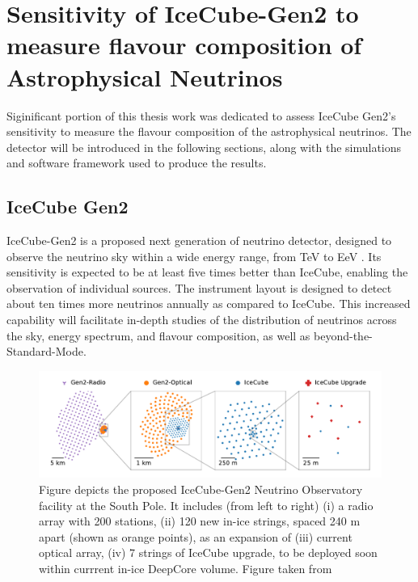 \setchapterpreamble[u]{\margintoc}
\chapter{Sensitivity of IceCube-Gen2 to measure flavour composition of Astrophysical Neutrinos}
Siginificant portion of this thesis work was dedicated to assess IceCube Gen2's sensitivity to measure the flavour composition of the astrophysical neutrinos. The detector will be introduced in the following sections, along with the simulations and software framework used to produce the results. 

\section{IceCube Gen2} 
\label{sec:gen2-detector}
IceCube-Gen2 is a proposed next generation of neutrino detector, designed to observe the neutrino sky within a wide energy range, from TeV to EeV . Its sensitivity is expected to be at least five times better than IceCube, enabling the observation of individual sources. The instrument layout is designed to detect about ten times more neutrinos annually as compared to IceCube. This increased capability will facilitate in-depth studies of the distribution of neutrinos across the sky, energy spectrum, and flavour composition, as well as beyond-the-Standard-Mode.
\begin{figure}[h!]
	\includegraphics[scale=1.5]{./figures/gen2/decadal_survey_gen2-fan_radio_geometry.pdf}
	\caption[Layout of IceCube-Gen2 geometry]{Figure depicts the proposed IceCube-Gen2 Neutrino Observatory facility at the South Pole. It includes (from left to right) (i) a radio array with 200 stations, (ii) 120 new in-ice strings, spaced 240 m apart (shown as orange points), as an expansion of (iii) current optical array, (iv) 7 strings of IceCube upgrade, to be deployed soon within currrent in-ice DeepCore volume. Figure taken from \cite{whitepaper}}
\end{figure}

